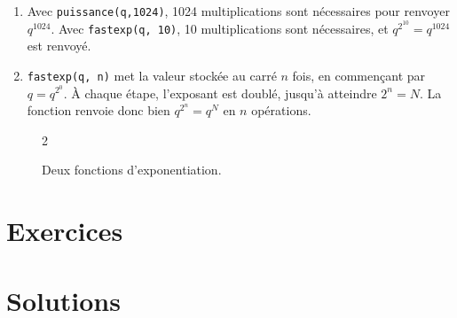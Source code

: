 {\begin{enumerate}
		\item 
		Avec \texttt{puissance(q,1024)}, 1024 multiplications sont nécessaires pour renvoyer $q^{1024}$.
		Avec \texttt{fastexp(q, 10)}, 10 multiplications sont nécessaires, et $q^{2^{10}} = q^{1024}$ est renvoyé.
		
		\item
		\texttt{fastexp(q, n)} met la valeur stockée au carré $n$ fois, en commençant par $q = q^{2^0}$.
		À chaque étape, l'exposant est doublé, jusqu'à atteindre $2^n = N$.
		La fonction renvoie donc bien $q^{2^n} = q^N$ en $n$ opérations.
		
	\end{enumerate}
}

\begin{figure}
	\begin{multicols}{2}
	\end{multicols}
	\caption{Deux fonctions d'exponentiation.}
	\label{fig:fast-exp}
\end{figure}

\section*{Exercices}

\shipoutExercise

\section*{Solutions}

\shipoutAnswer


